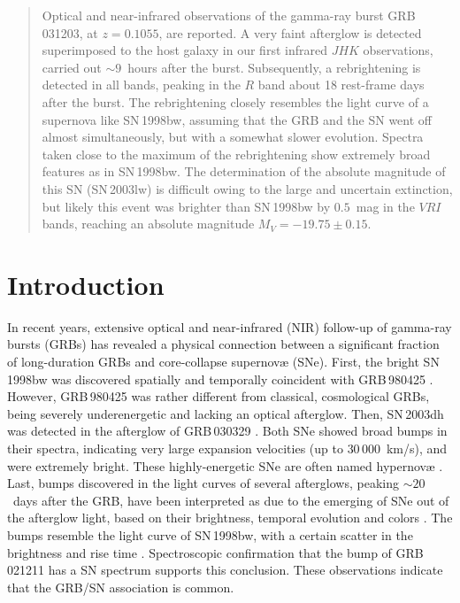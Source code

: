 \documentclass{emulateapj}
\begin{document}
\begin{abstract}
Optical and near-infrared observations of the gamma-ray burst
GRB\,031203, at $z = 0.1055$, are reported. A very faint afterglow is
detected superimposed to the host galaxy in our first infrared $JHK$
observations, carried out $\sim 9$~hours after the burst. Subsequently,
a rebrightening is detected in all bands, peaking in the $R$ band about
18 rest-frame days after the burst. The rebrightening closely resembles
the light curve of a supernova like SN\,1998bw, assuming that the GRB
and the SN went off almost simultaneously, but with a somewhat slower
evolution. Spectra taken close to the maximum of the rebrightening show
extremely broad features as in SN\,1998bw. The determination of the
absolute magnitude of this SN (SN\,2003lw) is difficult owing to the
large and uncertain extinction, but likely this event was brighter than
SN\,1998bw by $0.5$~mag in the $VRI$ bands, reaching an absolute
magnitude $M_V = -19.75 \pm 0.15$.
\end{abstract}




\section{Introduction}

In recent years, extensive optical and near-infrared (NIR) follow-up of
gamma-ray bursts (GRBs) has revealed a physical connection between a
significant fraction of long-duration GRBs and core-collapse
supernov\ae{} (SNe). First, the bright SN\,1998bw was discovered
spatially and temporally coincident with GRB\,980425
\citep{Ga98,Ku98}. However, GRB\,980425 was rather different from
classical, cosmological GRBs, being severely underenergetic and lacking
an optical afterglow. Then, SN\,2003dh was detected in the afterglow of
GRB\,030329 \citep{St03,Hj03}. Both SNe showed broad bumps in their
spectra, indicating very large expansion velocities (up to
$30\,000$~km/s), and were extremely bright.  These highly-energetic SNe
are often named hypernov\ae{} \citep[e.g.][]{Iw98}. Last, bumps
discovered in the light curves of several afterglows, peaking $\sim
20$~days after the GRB, have been interpreted as due to the emerging of
SNe out of the afterglow light, based on their brightness, temporal
evolution and colors \citep[e.g.][]{Bl99,Ga03}. The bumps resemble the
light curve of SN\,1998bw, with a certain scatter in the brightness and
rise time \citep[e.g.][]{Ze04}. Spectroscopic confirmation that the bump
of GRB\,021211 has a SN spectrum \citep[SN\,2002lt;][]{DV03} supports
this conclusion. These observations indicate that the GRB/SN association
is common.
\end{document}
